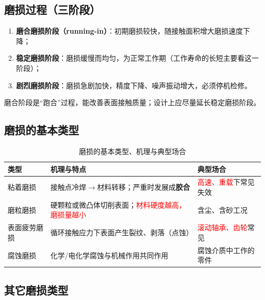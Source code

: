 \subsection{磨损过程（三阶段）}

\begin{definition}[磨损的三个阶段]
\label{def:磨损三阶段}
\begin{enumerate}
	\item \textbf{磨合磨损阶段（running-in）}：初期磨损较快，随接触面积增大磨损速度下降；
	\item \textbf{稳定磨损阶段}：磨损缓慢而均匀，为正常工作期（工作寿命的长短主要看这一阶段）；
	\item \textbf{剧烈磨损阶段}：磨损急剧加快，精度下降、噪声振动增大，必须停机检修。
\end{enumerate}
\end{definition}

\begin{note}
磨合阶段是“跑合”过程，能改善表面接触质量；设计上应尽量延长稳定磨损阶段。
\end{note}

\subsection{磨损的基本类型}

\begin{definition}[磨损的四种基本类型]
\label{def:磨损类型}
\begin{table}[H]
\centering
\caption{磨损的基本类型、机理与典型场合}
\label{tab:磨损:基本类型}
\begin{tabular}{p{2.2cm}p{6.8cm}p{3.4cm}}
	\toprule
	类型 & 机理与特点 & 典型场合 \\
	\midrule
	粘着磨损 & 接触点冷焊$\to$材料转移；严重时发展成\textbf{胶合} & \textcolor{red}{高速、重载}下常见失效 \\
	磨粒磨损 & 硬颗粒或微凸体切削表面；\textcolor{red}{材料硬度越高，磨损量越小} & 含尘、含砂工况 \\
	表面疲劳磨损 & 循环接触应力下表面产生裂纹、剥落（点蚀） & \textcolor{red}{滚动轴承、齿轮}常见 \\
	腐蚀磨损 & 化学/电化学腐蚀与机械作用共同作用 & 腐蚀介质中工作的零件 \\
	\bottomrule
\end{tabular}
\end{table}
\end{definition}

\subsection{其它磨损类型}

